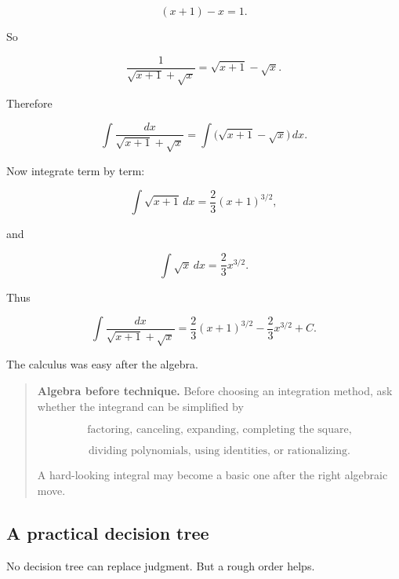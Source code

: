 \[
(x+1)-x=1.
\]

So

\[
\frac{1}{\sqrt{x+1}+\sqrt{x}}
=
\sqrt{x+1}-\sqrt{x}.
\]

Therefore

\[
\int \frac{dx}{\sqrt{x+1}+\sqrt{x}}
=
\int \bigl(\sqrt{x+1}-\sqrt{x}\bigr)\,dx.
\]

Now integrate term by term:

\[
\int \sqrt{x+1}\,dx
=
\frac23(x+1)^{3/2},
\]

and

\[
\int \sqrt{x}\,dx
=
\frac23x^{3/2}.
\]

Thus

\[
\boxed{
\int \frac{dx}{\sqrt{x+1}+\sqrt{x}}
=
\frac23(x+1)^{3/2}
-
\frac23x^{3/2}
+C.
}
\]

The calculus was easy after the algebra.

\begin{quote}
\textbf{Algebra before technique.}
Before choosing an integration method, ask whether the integrand can be simplified by

\[
\text{factoring, canceling, expanding, completing the square,}
\]

\[
\text{dividing polynomials, using identities, or rationalizing.}
\]

A hard-looking integral may become a basic one after the right algebraic move.
\end{quote}

\subsection{A practical decision tree}
\label{subsec:integration-decision-tree}

No decision tree can replace judgment.  But a rough order helps.

